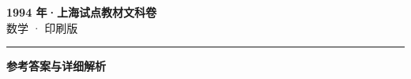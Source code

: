 \documentclass[zihao=5, a4paper]{ctexart}
\begin{document}
\begin{center}
  {\Large\bfseries 1994 年·上海试点教材文科卷}\\[4pt]
  {\large 数学 · 印刷版}
\end{center}
\medskip
{}

\par\bigskip\hrule\bigskip
{}
\begin{center}{\large\bfseries 参考答案与详细解析}\end{center}
\smallskip

\end{document}
